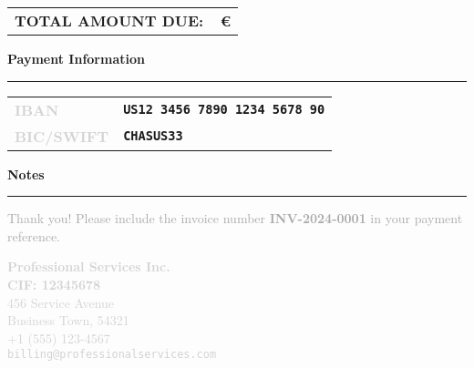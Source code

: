 \documentclass[11pt,a4paper]{article}
\makeatletter
\newcommand{\companyname}{Professional Services Inc.}
\newcommand{\companycif}{CIF: 12345678}
\newcommand{\companystreet}{456 Service Avenue}
\newcommand{\companycity}{Business Town, 54321}
\newcommand{\companyphone}{+1 (555) 123-4567}
\newcommand{\companyemail}{billing@professionalservices.com}
\newcommand{\invoicenumber}{INV-2024-0001}
\newcommand{\companyiban}{US12 3456 7890 1234 5678 90}
\newcommand{\companybic}{CHASUS33}
\newcommand{\currencysymbol}{\euro}
\def\totalamount{0}
\newcommand{\formatcurrency}[1]{%
    \fpeval{round(#1, 2)}\,\currencysymbol%
}
\newcommand{\sectionskip}{\vspace{0.8cm}}
\newcommand{\itemskip}{\vspace{0.5cm}}
\newcommand{\blockskip}{\vspace{0.3cm}}
\newlength{\smallgap}
\newcommand{\layoutlabel}[1]{\textbf{\textcolor{lightgray}{\footnotesize\MakeUppercase{#1}}}}
\newcommand{\primarytext}[1]{\textcolor{primaryblue}{#1}}
\newcommand{\emphasizedtext}[1]{\textbf{\primarytext{#1}}}
\newcommand{\sectionheader}[1]{%
    \noindent%
    {\Large\emphasizedtext{#1}}%
    \par\vspace{-0.2cm}%
    \noindent%
    \primarytext{\rule{\textwidth}{0.8pt}}%
    \blockskip%
}
\newcommand{\displaytotal}{%
    \begin{flushright}
        \begin{tabular}{lr}
            \large\emphasizedtext{TOTAL AMOUNT DUE:} & 
            {\Large\emphasizedtext{\formatcurrency{\totalamount}}} \\
        \end{tabular}
    \end{flushright}
}
\makeatother
\begin{document}
\displaytotal

\blockskip

\sectionheader{Payment Information}

\begin{tabular}{@{}p{3cm}l@{}}
    \layoutlabel{IBAN} & \texttt{\textbf{\companyiban}} \\[\smallgap]
    \layoutlabel{BIC/SWIFT} & \texttt{\textbf{\companybic}} \\[\smallgap]
\end{tabular}

\itemskip

\sectionheader{Notes}

\textcolor{darkgray}{%
\small Thank you! Please include the invoice number \textbf{\invoicenumber} in your payment reference.}

\sectionskip

\begin{center}
    {\small\textcolor{lightgray}{%
        \textbf{\companyname} \\ \textbf{\companycif} \\ \companystreet \\ \companycity \\ \companyphone \\ \texttt{\companyemail}
    }}
\end{center}
\end{document}
